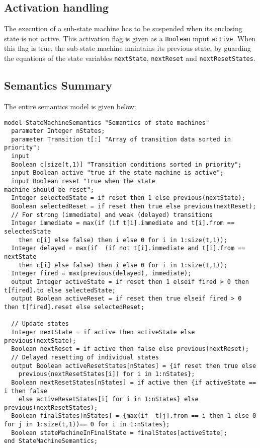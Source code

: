 \subsection{Activation handling}\label{activation-handling}

The execution of a sub-state machine has to be suspended when its
enclosing state is not active. This activation flag is given as a
\lstinline!Boolean! input \lstinline!active!. When this flag is true, the sub-state machine
maintains its previous state, by guarding the equations of the state
variables \lstinline!nextState!, \lstinline!nextReset! and \lstinline!nextResetStates!.

\subsection{Semantics Summary}\label{semantics-summary}

The entire semantics model is given below:
\begin{lstlisting}[language=modelica]
model StateMachineSemantics "Semantics of state machines"
  parameter Integer nStates;
  parameter Transition t[:] "Array of transition data sorted in priority";
  input
  Boolean c[size(t,1)] "Transition conditions sorted in priority";
  input Boolean active "true if the state machine is active";
  input Boolean reset "true when the state
machine should be reset";
  Integer selectedState = if reset then 1 else previous(nextState);
  Boolean selectedReset = if reset then true else previous(nextReset);
  // For strong (immediate) and weak (delayed) transitions
  Integer immediate = max(if (if t[i].immediate and t[i].from == selectedState
    then c[i] else false) then i else 0 for i in 1:size(t,1));
  Integer delayed = max(if  (if not t[i].immediate and t[i].from == nextState
    then c[i] else false) then i else 0 for i in 1:size(t,1));
  Integer fired = max(previous(delayed), immediate);
  output Integer activeState = if reset then 1 elseif fired > 0 then t[fired].to else selectedState;
  output Boolean activeReset = if reset then true elseif fired > 0 then t[fired].reset else selectedReset;

  // Update states
  Integer nextState = if active then activeState else previous(nextState);
  Boolean nextReset = if active then false else previous(nextReset);
  // Delayed resetting of individual states
  output Boolean activeResetStates[nStates] = {if reset then true else
    previous(nextResetStates[i]) for i in 1:nStates};
  Boolean nextResetStates[nStates] = if active then {if activeState == i then false
    else activeResetStates[i] for i in 1:nStates} else previous(nextResetStates);
  Boolean finalStates[nStates] = {max(if  t[j].from == i then 1 else 0 for j in 1:size(t,1))== 0 for i in 1:nStates};
  Boolean stateMachineInFinalState = finalStates[activeState];
end StateMachineSemantics;
\end{lstlisting}
